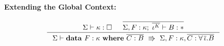 \paragraph{Extending the Global Context:}
\[ \inference[]{ \Sigma |- \kappa : \square
               & \overline{\Sigma,F:\kappa;\;\overline{\iota^K} |- B:*} }
               { \Sigma |- \mathbf{data}~ F : \kappa ~ \mathbf{where} ~
                                        \overline{C : B}
                        ~\Rrightarrow~
                           \Sigma,F:\kappa
                                 ,\overline{C:\forall\,\overline{\iota}.B} }
\]
